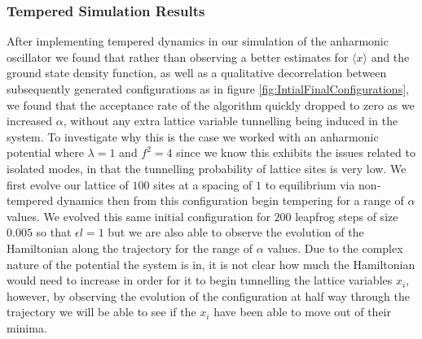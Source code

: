 \documentclass[12pt]{article}
\begin{document}
    \subsubsection{Tempered Simulation Results}
    After implementing tempered dynamics in our simulation of the anharmonic oscillator we found that rather than observing a better estimates for $\langle x \rangle$ and the ground state density function, as well as a qualitative decorrelation between subsequently generated configurations as in figure \ref{fig:IntialFinalConfigurations}, we found that the acceptance rate of the algorithm quickly dropped to zero as we increased $\alpha$, without any extra lattice variable tunnelling being induced in the system. To investigate why this is the case we worked with an anharmonic potential where $\lambda=1$ and $f^2=4$ since we know this exhibits the issues related to isolated modes, in that the tunnelling probability of lattice sites is very low. We first evolve our lattice of $100$ sites at a spacing of $1$ to equilibrium via non-tempered dynamics then from this configuration begin tempering for a range of $\alpha$ values. We evolved this same initial configuration for $200$ leapfrog steps of size $0.005$ so that $\epsilon l = 1$ but we are also able to observe the evolution of the Hamiltonian along the trajectory for the range of $\alpha$ values. Due to the complex nature of the potential the system is in, it is not clear how much the Hamiltonian would need to increase in order for it to begin tunnelling the lattice variables $x_i$, however, by observing the evolution of the configuration at half way through the trajectory we will be able to see if the $x_i$ have been able to move out of their minima.
\end{document}
